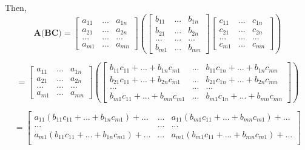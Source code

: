 \documentclass{article}
\begin{document}
\begin{enumerate}
		Then, 
		$$\textbf{A(BC)} = \begin{bmatrix}
		a_{11}  &  ... & a_{1n} \\
		a_{21}  &  ... & a_{2n} \\
		...     &  ... & ...    \\
		a_{m1}  &  ... & a_{mn} 
		\end{bmatrix}
		\left(
		\begin{bmatrix}
		b_{11}  &  ... & b_{1n} \\
		b_{21}  &  ... & b_{2n} \\
		...     &  ... & ...    \\
		b_{m1}  &  ... & b_{mn}
		\end{bmatrix} \begin{bmatrix}
		c_{11}  &  ... & c_{1n} \\
		c_{21}  &  ... & c_{2n} \\
		...     &  ... & ...    \\
		c_{m1}  &  ... & c_{mn}
		\end{bmatrix}\right)$$
		
		$$= \begin{bmatrix}
		a_{11}  &  ... & a_{1n} \\
		a_{21}  &  ... & a_{2n} \\
		...     &  ... & ...    \\
		a_{m1}  &  ... & a_{mn} 
		\end{bmatrix}
		\left(
		\begin{bmatrix}
		b_{11} c_{11} + ... + b_{1n} c_{m1} & ... & b_{11} c_{1n} + ... + b_{1n} c_{mn} \\
		b_{21} c_{11} + ... + b_{2n} c_{m1} & ... & b_{21} c_{1n} + ... + b_{2n} c_{mn} \\
		...       &      ...      &      ...      \\
		b_{m1} c_{11} + ... + b_{mn} c_{m1}  & ... & b_{m1} c_{1n} + ... + b_{mn} c_{mn}
		\end{bmatrix}\right)$$
		
		$$= \begin{bmatrix}
		a_{11} (b_{11} c_{11} + ... + b_{1n} c_{m1}) + ...  & ... & a_{11} (b_{m1} c_{11} + ... + b_{mn} c_{m1}) + ... \\
		...       &      ...      &      ...      \\
		a_{m1} (b_{11} c_{11} + ... + b_{1n} c_{m1}) + ...  & ... & a_{m1} (b_{m1} c_{11} + ... + b_{mn} c_{m1}) + ... \\
		\end{bmatrix}$$
		

\end{enumerate}
\end{document}

